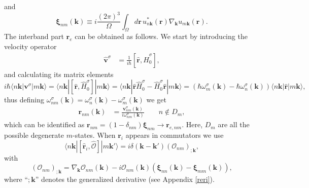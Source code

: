 and
\begin{equation}\label{zetann}
\boldsymbol{\xi}_{nm}(\mathbf{k}) \equiv i\frac{(2\pi)^3}{\Omega}
\int_{\Omega} d\mathbf{r}\, u^{*}_{n\mathbf{k}}(\mathbf{r})
\nabla_{\mathbf{k}}u_{m\mathbf{k}}(\mathbf{r}).
\end{equation}
The interband part $\mathbf{r}_{e}$ can
be obtained as follows. 
We start by introducing the 
velocity operator
\begin{align}\label{vop}
\hat{\mathbf{v}}^{\sigma} &=
\frac{1}{i\hbar}[\hat{\mathbf{r}},\hat{H}^{\sigma}_{0}]
,
\end{align}
and calculating its matrix elements
\begin{equation}\label{conhrnm}
i\hbar
\langle n\mathbf{k}|
\mathbf{v}^\sigma
|m\mathbf{k}\rangle
=
\langle n\mathbf{k}|
[\hat{\mathbf{r}},\hat{H}^{\sigma}_{0}]
|m\mathbf{k}\rangle
=\langle n\mathbf{k}| \hat{\mathbf{r}}\hat{H}^{\sigma}_{0} - \hat{H}^{\sigma}_{0}\hat{\mathbf{r}} |m\mathbf{k}\rangle
=(\hbar\omega^\sigma_m(\mathbf{k})-\hbar\omega^{\sigma}_{n}(\mathbf{k}))\langle n\mathbf{k}|\hat{\mathbf{r}} |m\mathbf{k}\rangle
,
\end{equation}
thus defining $\omega^\sigma_{nm}(\mathbf{k})=\omega^{\sigma}_{n}(\mathbf{k})-\omega^\sigma_m(\mathbf{k})$ we get
\begin{align}\label{pmnrmn}
\mathbf{r}_{nm}(\mathbf{k})
&=
\frac{\mathbf{v}^\sigma_{nm}(\mathbf{k})}{i\omega^\sigma_{nm}(\mathbf{k})}
\quad\quad n\notin D_m
,
\end{align} 
which can be identified as 
$\mathbf{r}_{nm}=(1-\delta_{nm})\boldsymbol{\xi}_{nm}\to \mathbf{r}_{e,nm}$.
Here, $D_m$ are all the possible degenerate $m$-states.
When $\mathbf{r}_i$ appears in
commutators we use\cite{aversaPRB95} 
\begin{equation}\label{conmri3n}
\langle n\mathbf{k}| [\hat{\mathbf{r}}_{i},\hat{\mathcal{O}}] |m\mathbf{k}'\rangle
= i\delta(\mathbf{k} - \mathbf{k}')(\mathcal{O}_{nm})_{;\mathbf{k}},
\end{equation}  
with
\begin{equation}\label{gendevnn}
(\mathcal{O}_{nm})_{;\mathbf{k}} =
\nabla_{\mathbf{k}}
\mathcal{O}_{nm}(\mathbf{k})
- i\mathcal{O}_{nm}(\mathbf{k})
\left(
\boldsymbol{\xi}_{nn}(\mathbf{k})
-
\boldsymbol{\xi}_{mm}(\mathbf{k})
\right)
,
\end{equation} 
where ``$;\mathbf{k}$'' denotes the generalized derivative (see Appendix \ref{reri}). 

